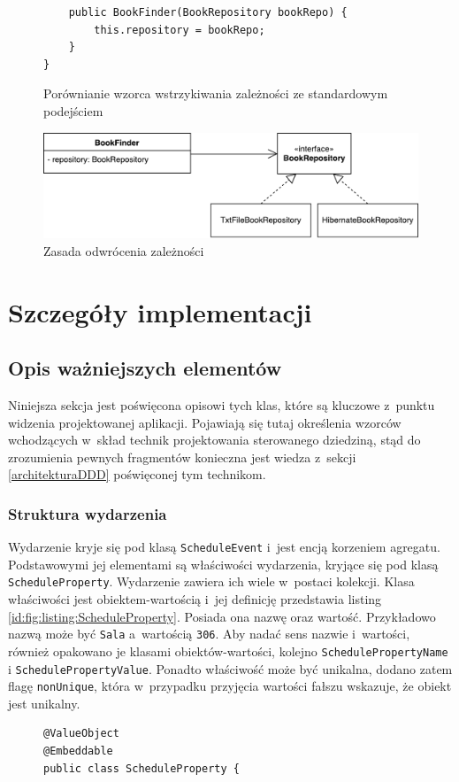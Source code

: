 \documentclass[a4paper]{book}
\begin{document}
{\begin{figure}
\begin{lstlisting}
	public BookFinder(BookRepository bookRepo) {
		this.repository = bookRepo;
	}
}
\end{lstlisting}
\caption{Porównianie wzorca wstrzykiwania zależności ze standardowym podejściem}
\label{id:fig:listing:DIvsNonDI}
\end{figure}
\begin{figure}
	\centering
	\includegraphics[width=1.0\textwidth]{./img/dipUML.pdf}
	\caption{Zasada odwrócenia zależności}
	\label{id:fig:dipUML}
\end{figure}



\section{Szczegóły implementacji}
\subsection{Opis ważniejszych elementów} %
Niniejsza sekcja jest poświęcona opisowi tych klas, które są kluczowe z~punktu widzenia projektowanej aplikacji. Pojawiają się tutaj określenia wzorców wchodzących w~skład technik projektowania sterowanego dziedziną, stąd do zrozumienia pewnych fragmentów konieczna jest wiedza z~sekcji \ref{architekturaDDD} poświęconej tym technikom.

\subsubsection{Struktura wydarzenia}
Wydarzenie kryje się pod klasą \lstinline|ScheduleEvent| i~jest encją korzeniem agregatu. Podstawowymi jej elementami są właściwości wydarzenia, kryjące się pod klasą \lstinline|ScheduleProperty|. Wydarzenie zawiera ich wiele w~postaci kolekcji. Klasa właściwości jest obiektem-wartością i~jej definicję przedstawia listing \ref{id:fig:listing:ScheduleProperty}. Posiada ona nazwę oraz wartość. Przykładowo nazwą może być \lstinline|Sala| a~wartością \lstinline|306|. Aby nadać sens nazwie i~wartości, również opakowano je klasami obiektów-wartości, kolejno \lstinline|SchedulePropertyName| i \lstinline|SchedulePropertyValue|. Ponadto właściwość może być unikalna, dodano zatem flagę \lstinline|nonUnique|, która w~przypadku przyjęcia wartości fałszu wskazuje, że obiekt jest unikalny.
\begin{figure}
\begin{lstlisting}
@ValueObject
@Embeddable
public class ScheduleProperty {


\end{lstlisting}
\end{figure}}
\end{document}

